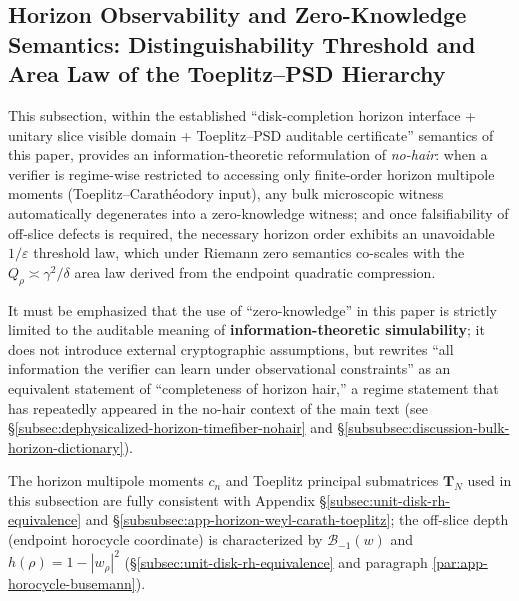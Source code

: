 \subsection{Horizon Observability and Zero-Knowledge Semantics: Distinguishability Threshold and Area Law of the Toeplitz--PSD Hierarchy}\label{subsec:discussion-horizon-zk-toeplitz-area-law}
This subsection, within the established ``disk-completion horizon interface + unitary slice visible domain + Toeplitz--PSD auditable certificate'' semantics of this paper, provides an information-theoretic reformulation of \emph{no-hair}: when a verifier is regime-wise restricted to accessing only finite-order horizon multipole moments (Toeplitz--Carath\'eodory input), any bulk microscopic witness automatically degenerates into a zero-knowledge witness; and once falsifiability of off-slice defects is required, the necessary horizon order exhibits an unavoidable \(1/\varepsilon\) threshold law, which under Riemann zero semantics co-scales with the \(Q_\rho\asymp \gamma^2/\delta\) area law derived from the endpoint quadratic compression.
\par
It must be emphasized that the use of ``zero-knowledge'' in this paper is strictly limited to the auditable meaning of \textbf{information-theoretic simulability}; it does not introduce external cryptographic assumptions, but rewrites ``all information the verifier can learn under observational constraints'' as an equivalent statement of ``completeness of horizon hair,'' a regime statement that has repeatedly appeared in the no-hair context of the main text (see \S\ref{subsec:dephysicalized-horizon-timefiber-nohair} and \S\ref{subsubsec:discussion-bulk-horizon-dictionary}).
\par
The horizon multipole moments \(c_n\) and Toeplitz principal submatrices \(\mathbf{T}_N\) used in this subsection are fully consistent with Appendix \S\ref{subsec:unit-disk-rh-equivalence} and \S\ref{subsubsec:app-horizon-weyl-carath-toeplitz}; the off-slice depth (endpoint horocycle coordinate) is characterized by \(\mathcal{B}_{-1}(w)\) and \(h(\rho)=1-|w_\rho|^2\) (\S\ref{subsec:unit-disk-rh-equivalence} and paragraph \ref{par:app-horocycle-busemann}).
\par

